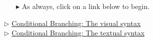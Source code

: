 \vspace{0.5cm}
\begin{itemize}
\item[$\blacktriangleright$] As always, click on a link below to begin.
\end{itemize}

\begin{center} {$\triangleright$ \hyperlink{conBran vis}{Conditional Branching: The visual syntax}}%
\\ \vspace{0.5cm}
 {$\triangleright$ \hyperlink{conBran tex}{Conditional Branching: The textual syntax}}\end{center} 



